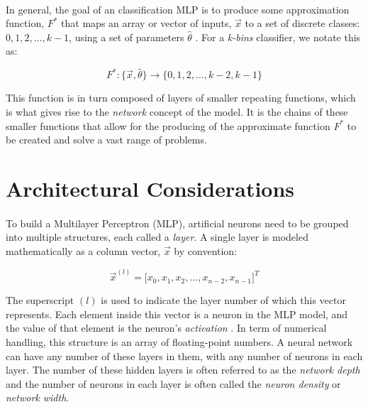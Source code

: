 \documentclass[12pt,letterpaper]{article}
\begin{document}
\paragraph*{}In general, the goal of an classification MLP is to produce some approximation function, $F^*$ that maps an array or vector of inputs, 
$\vec{x}$ to a set of discrete classes: $0,1,2,...,k-1$, using a set of parameters $\hat{\theta}$ \cite{Geron,Goodfellow,Petrik}. For a \textit{k-bins} classifier, we notate this as:

\begin{equation}
\label{approx}
F^* : \big\{ \vec{x},\hat{\theta}\big\} \rightarrow \big\{ 0,1,2,...,k-2,k-1 \big\}
\end{equation}

This function is in turn composed of layers of smaller repeating functions, which is what gives rise to the \textit{network} concept of the model. It is the chains of these smaller functions that allow for the producing of the approximate function $F^*$ to be created and solve a vast range of problems.



\section*{Architectural Considerations}
\paragraph*{}To build a Multilayer Perceptron (MLP), artificial neurons need to be grouped into multiple structures, each called a \textit{layer}. A single layer is modeled mathematically as a column vector, $\vec{x}$ by convention:

\begin{equation}
\label{layer}
\vec{x}^{(l)} = \big[ x_0 , x_1 , x_2 , ... , x_{n-2} , x_{n-1} \big]^T
\end{equation}

The superscript $(l)$ is used to indicate the layer number of which this vector represents. Each element inside this vector is a neuron in the MLP model, and the value of that element is the neuron's \textit{activation} \cite{Geron}. In term of numerical handling, this structure is an array of floating-point numbers. A neural network can have any number of these layers in them, with any number of neurons in each layer. The number of these hidden layers is often referred to as the \textit{network depth} and the number of neurons in each layer is often called the \textit{neuron density} or \textit{network width}.
\end{document}
